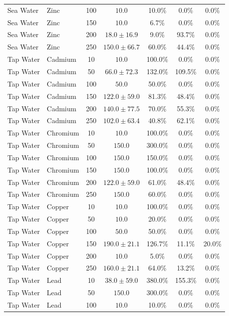 \begin{table}[!t]
\begin{tabular}{llccccc}
Sea Water & Zinc & 100 & $10.0$ & 10.0\% & 0.0\% & 0.0\% \\
Sea Water & Zinc & 150 & $10.0$ & 6.7\% & 0.0\% & 0.0\% \\
Sea Water & Zinc & 200 & $18.0 \pm 16.9$ & 9.0\% & 93.7\% & 0.0\% \\
Sea Water & Zinc & 250 & $150.0 \pm 66.7$ & 60.0\% & 44.4\% & 0.0\% \\
\midrule
Tap Water & Cadmium & 10 & $10.0$ & 100.0\% & 0.0\% & 0.0\% \\
Tap Water & Cadmium & 50 & $66.0 \pm 72.3$ & 132.0\% & 109.5\% & 0.0\% \\
Tap Water & Cadmium & 100 & $50.0$ & 50.0\% & 0.0\% & 0.0\% \\
Tap Water & Cadmium & 150 & $122.0 \pm 59.0$ & 81.3\% & 48.4\% & 0.0\% \\
Tap Water & Cadmium & 200 & $140.0 \pm 77.5$ & 70.0\% & 55.3\% & 0.0\% \\
Tap Water & Cadmium & 250 & $102.0 \pm 63.4$ & 40.8\% & 62.1\% & 0.0\% \\
Tap Water & Chromium & 10 & $10.0$ & 100.0\% & 0.0\% & 0.0\% \\
Tap Water & Chromium & 50 & $150.0$ & 300.0\% & 0.0\% & 0.0\% \\
Tap Water & Chromium & 100 & $150.0$ & 150.0\% & 0.0\% & 0.0\% \\
Tap Water & Chromium & 150 & $150.0$ & 100.0\% & 0.0\% & 0.0\% \\
Tap Water & Chromium & 200 & $122.0 \pm 59.0$ & 61.0\% & 48.4\% & 0.0\% \\
Tap Water & Chromium & 250 & $150.0$ & 60.0\% & 0.0\% & 0.0\% \\
Tap Water & Copper & 10 & $10.0$ & 100.0\% & 0.0\% & 0.0\% \\
Tap Water & Copper & 50 & $10.0$ & 20.0\% & 0.0\% & 0.0\% \\
Tap Water & Copper & 100 & $50.0$ & 50.0\% & 0.0\% & 0.0\% \\
Tap Water & Copper & 150 & $190.0 \pm 21.1$ & 126.7\% & 11.1\% & 20.0\% \\
Tap Water & Copper & 200 & $10.0$ & 5.0\% & 0.0\% & 0.0\% \\
Tap Water & Copper & 250 & $160.0 \pm 21.1$ & 64.0\% & 13.2\% & 0.0\% \\
Tap Water & Lead & 10 & $38.0 \pm 59.0$ & 380.0\% & 155.3\% & 0.0\% \\
Tap Water & Lead & 50 & $150.0$ & 300.0\% & 0.0\% & 0.0\% \\
Tap Water & Lead & 100 & $10.0$ & 10.0\% & 0.0\% & 0.0\% \\

\end{tabular}
\end{table}
